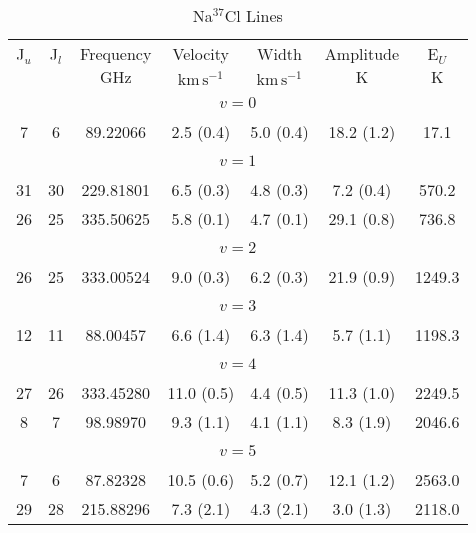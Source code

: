 \begin{table*}[htp]
\centering
\caption{Na$^{37}$Cl Lines}
\begin{tabular}{ccccccc}
\label{tab:Na37Cl_salt_lines}
 J$_u$ & J$_l$ & Frequency & Velocity & Width & Amplitude & E$_U$ \\
  &  & $\mathrm{GHz}$ & $\mathrm{km\,s^{-1}}$ & $\mathrm{km\,s^{-1}}$ & $\mathrm{K}$ & $\mathrm{K}$ \\
\hline
&\vspace{-0.75em}\\
\multicolumn{7}{c}{$v = 0$} \\
\vspace{-0.75em}\\
 7 & 6 & 89.22066 & 2.5 (0.4) & 5.0 (0.4) & 18.2 (1.2) & 17.1 \\
&\vspace{-0.75em}\\
\multicolumn{7}{c}{$v = 1$} \\
\vspace{-0.75em}\\
 31 & 30 & 229.81801 & 6.5 (0.3) & 4.8 (0.3) & 7.2 (0.4) & 570.2 \\
 26 & 25 & 335.50625 & 5.8 (0.1) & 4.7 (0.1) & 29.1 (0.8) & 736.8 \\
&\vspace{-0.75em}\\
\multicolumn{7}{c}{$v = 2$} \\
\vspace{-0.75em}\\
 26 & 25 & 333.00524 & 9.0 (0.3) & 6.2 (0.3) & 21.9 (0.9) & 1249.3 \\
&\vspace{-0.75em}\\
\multicolumn{7}{c}{$v = 3$} \\
\vspace{-0.75em}\\
 12 & 11 & 88.00457 & 6.6 (1.4) & 6.3 (1.4) & 5.7 (1.1) & 1198.3 \\
&\vspace{-0.75em}\\
\multicolumn{7}{c}{$v = 4$} \\
\vspace{-0.75em}\\
 27 & 26 & 333.45280 & 11.0 (0.5) & 4.4 (0.5) & 11.3 (1.0) & 2249.5 \\
 8 & 7 & 98.98970 & 9.3 (1.1) & 4.1 (1.1) & 8.3 (1.9) & 2046.6 \\
&\vspace{-0.75em}\\
\multicolumn{7}{c}{$v = 5$} \\
\vspace{-0.75em}\\
 7 & 6 & 87.82328 & 10.5 (0.6) & 5.2 (0.7) & 12.1 (1.2) & 2563.0 \\
 29 & 28 & 215.88296 & 7.3 (2.1) & 4.3 (2.1) & 3.0 (1.3) & 2118.0 \\
\hline
\end{tabular}

\par 
\end{table*}
